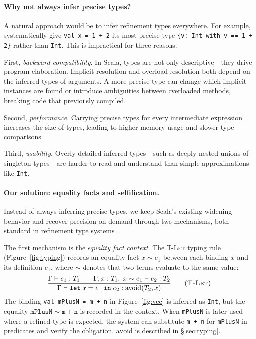 \documentclass[acmsmall]{acmart}
\begin{document}
\paragraph{Why not always infer precise types?}
A natural approach would be to infer refinement types everywhere. For example, systematically give \lstinline!val x = 1 + 2! its most precise type \lstinline!{v: Int with v == 1 + 2}! rather than \lstinline!Int!. This is impractical for three reasons.

First, \emph{backward compatibility}. In Scala, types are not only descriptive---they drive program elaboration. Implicit resolution and overload resolution both depend on the inferred types of arguments. A more precise type can change which implicit instances are found or introduce ambiguities between overloaded methods, breaking code that previously compiled.

Second, \emph{performance}. Carrying precise types for every intermediate expression increases the size of types, leading to higher memory usage and slower type comparisons.

Third, \emph{usability}. Overly detailed inferred types---such as deeply nested unions of singleton types---are harder to read and understand than simple approximations like \lstinline!Int!.

\paragraph{Our solution: equality facts and selfification.}
Instead of always inferring precise types, we keep Scala's existing widening behavior and recover precision on demand through two mechanisms, both standard in refinement type systems~\cite{hamza2019,borkowski2022,sun2024}.

The first mechanism is the \emph{equality fact context}. The \textsc{T-Let} typing rule (Figure~\ref{fig:typing}) records an equality fact $x \sim e_1$ between each binding $x$ and its definition $e_1$, where $\sim$ denotes that two terms evaluate to the same value:
%
\[
\frac{\Gamma \vdash e_1 : T_1 \qquad
  \Gamma, x : T_1,\; x \sim e_1 \vdash e_2 : T_2}
     {\Gamma \vdash \texttt{let}\; x = e_1\; \texttt{in}\; e_2 : \text{avoid}(T_2, x)}
\qquad\text{(\textsc{T-Let})}
\]
%
The binding \lstinline!val mPlusN = m + n! in Figure~\ref{fig:vec} is inferred as \lstinline!Int!, but the equality $\mathtt{mPlusN} \sim \mathtt{m + n}$ is recorded in the context. When \lstinline!mPlusN! is later used where a refined type is expected, the system can substitute \lstinline!m + n! for \lstinline!mPlusN! in predicates and verify the obligation. $\text{avoid}$ is described in \S\ref{sec:typing}.
\end{document}
